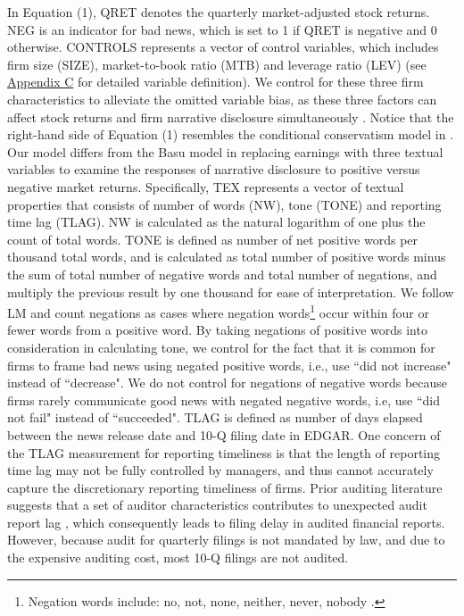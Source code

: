 \documentclass[a4paper]{article}
\begin{document}
\begin{spacing}{2}
In Equation (1), QRET denotes the quarterly market-adjusted stock returns. NEG is an indicator for bad news, which is set to 1 if QRET is negative and 0 otherwise. CONTROLS represents a vector of control variables, which includes firm size (SIZE), market-to-book ratio (MTB) and leverage ratio (LEV) (see \hyperref[appc]{Appendix C} for detailed variable definition). We control for these three firm characteristics to alleviate the omitted variable bias, as these three factors can affect stock returns and firm narrative disclosure simultaneously . %
Notice that the right-hand side of Equation (1) resembles the conditional conservatism model in . Our model differs from the Basu model in replacing earnings with three textual variables to examine the responses of narrative disclosure to positive versus negative market returns. Specifically, TEX represents a vector of textual properties that consists of number of words (NW), tone (TONE) and reporting time lag (TLAG). NW is calculated as the natural logarithm of one plus the count of total words. TONE is defined as number of net positive words per thousand total words, and is calculated as total number of positive words minus the sum of total number of negative words and total number of negations, and multiply the previous result by one thousand for ease of interpretation. We follow LM and count negations as cases where negation words\footnote{Negation words include: no, not, none, neither, never, nobody .} occur within four or fewer words from a positive word. By taking negations of positive words into consideration in calculating tone, we control for the fact that it is common for firms to frame bad news using negated positive words, i.e., use ``did not increase" instead of ``decrease". We do not control for negations of negative words because firms rarely communicate good news with negated negative words, i.e, use ``did not fail" instead of ``succeeded". TLAG is defined as number of days elapsed between the news release date and 10-Q filing date in EDGAR. One concern of the TLAG measurement for reporting timeliness is that the length of reporting time lag may not be fully controlled by managers, and thus cannot accurately capture the discretionary reporting timeliness of firms. Prior auditing literature suggests that a set of auditor characteristics contributes to unexpected audit report lag , which consequently leads to filing delay in audited financial reports. However, because audit for quarterly filings is not mandated by law, and due to the expensive auditing cost, most 10-Q filings are not audited.


\end{spacing}
\end{document}
